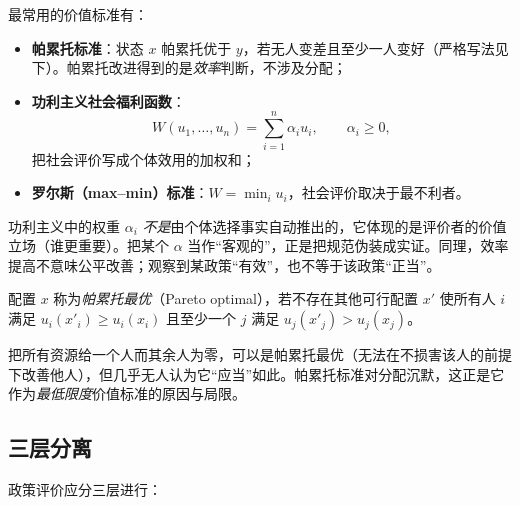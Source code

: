最常用的价值标准有：
\begin{itemize}
  \item \textbf{帕累托标准}：状态 $x$ 帕累托优于 $y$，若无人变差且至少一人变好（严格写法见下）。帕累托改进得到的是\emph{效率}判断，不涉及分配；
  \item \textbf{功利主义社会福利函数}：
        \[
        W(u_1,\dots,u_n)=\sum_{i=1}^{n}\alpha_i u_i,\qquad \alpha_i\ge 0,
        \]
        把社会评价写成个体效用的加权和；
  \item \textbf{罗尔斯（max–min）标准}：$W=\min_i u_i$，社会评价取决于最不利者。
\end{itemize}

\begin{remark}[权重不是事实]
功利主义中的权重 $\alpha_i$ \emph{不是}由个体选择事实自动推出的，它体现的是评价者的价值立场（谁更重要）。把某个 $\alpha$ 当作“客观的”，正是把规范伪装成实证。同理，效率提高不意味公平改善；观察到某政策“有效”，也不等于该政策“正当”。
\end{remark}

\begin{definition}[帕累托最优]
配置 $x$ 称为\emph{帕累托最优}（Pareto optimal），若不存在其他可行配置 $x'$ 使所有人 $i$ 满足 $u_i(x'_i)\ge u_i(x_i)$ 且至少一个 $j$ 满足 $u_j(x'_j)>u_j(x_j)$。
\end{definition}

\begin{example}[效率与公平可以背离]
把所有资源给一个人而其余人为零，可以是帕累托最优（无法在不损害该人的前提下改善他人），但几乎无人认为它“应当”如此。帕累托标准对分配沉默，这正是它作为\emph{最低限度}价值标准的原因与局限。
\end{example}

\subsection{三层分离}

政策评价应分三层进行：

